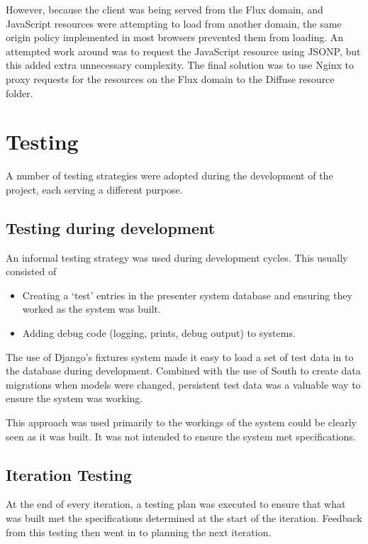 \documentclass[a4papert,11pt,notitlepage]{ltxdoc}
\begin{document}
However, because the client was being served from the Flux domain, and JavaScript resources were attempting to load from another domain, the same origin policy implemented in most browsers prevented them from loading. An attempted work around was to request the JavaScript resource using JSONP, but this added extra unnecessary complexity. The final solution was to use Nginx to proxy requests for the resources on the Flux domain to the Diffuse resource folder.


\pagebreak
\section{Testing}
A number of testing strategies were adopted during the development of the project, each serving a different purpose.

\subsection{Testing during development}
An informal testing strategy was used during development cycles. This usually consisted of
\begin{itemize}
\item Creating a `test' entries in the presenter system database and ensuring they worked as the system was built. 
\item Adding debug code (logging, prints, debug output) to systems.
\end{itemize}

The use of Django's fixtures system made it easy to load a set of test data in to the database during development. Combined with the use of South\cite{south:web} to create data migrations when models were changed, persistent test data was a valuable way to ensure the system was working.

This approach was used primarily to the workings of the system could be clearly seen as it was built. It was not intended to ensure the system met specifications.


\subsection{Iteration Testing}
At the end of every iteration, a testing plan was executed to ensure that what was built met the specifications determined at the start of the iteration. Feedback from this testing then went in to planning the next iteration.
\end{document}

